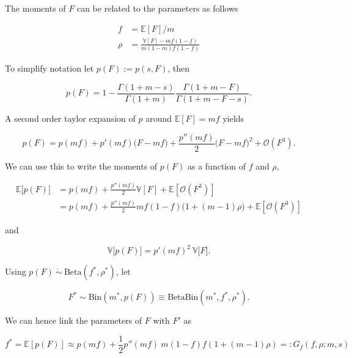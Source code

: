 \documentclass[american, abstract=on]{scrartcl}
\newcommand{\E}{\mathbb{E}}
\newcommand{\V}{\mathbb{V}}
\begin{document}
The moments of $F$ can be related to the parameters as follows

\begin{equation}
  \begin{split}
    f &= \E\left[F\right] / m \\
    \rho &= \frac{\V[F] - m f (1 - f)}{m (1 - m) f (1 - f)}
  \end{split}
\end{equation}

To simplify notation let $p(F) := p(s, F)$, then

\begin{equation}
  p(F) = 1 - \frac{\Gamma(1 + m - s)}{\Gamma(1 + m)}\frac{\Gamma(1 + m - F)}{\Gamma(1 + m - F - s)}.
\end{equation}

A second order taylor expansion of $p$ around $\E[F] = m f$ yields

\begin{equation}
  p(F) = p(m f) + p'(m f) \big(F - m f\big) + \frac{p''(m f)}{2} \big(F - m f\big)^2 + \mathcal{O}\left(F^3\right).
\end{equation}

We can use this to write the moments of $p(F)$ as a function of $f$ and $\rho$, 

\begin{equation}
  \begin{split}
    \E\big[p(F)\big]  &= p(m f) + \frac{p''(m f)}{2} \V[F] + \E\left[\mathcal{O}\left(F^3\right) \right] \\
    &= p(m f) + \frac{p''(m f)}{2} m f (1 - f) \big(1 + (m-1) \rho \big) +\E\left[\mathcal{O}\left(F^3\right) \right]
  \end{split}
\end{equation}

and

\begin{equation}
  \V\big[p(F)\big] = p'(m f)^2 \  \V\big[F\big].
\end{equation}

Using $p(F) \ \dot{\sim} \ \text{Beta}(f^*, \rho^*)$, let

\begin{equation}
  F^* \sim \text{Bin}(m^*, p(F)) \equiv \text{BetaBin}(m^*, f^*, \rho^*).
\end{equation}

We can hence link the parameters of $F$ with $F'$ as

\begin{equation}
  f^* = \E[p(F)] \approx p(m f) + \frac{1}{2} p''(m f) \ m (1 - f) f (1 + (m - 1) \rho) =: G_f(f, \rho; m, s)
\end{equation}
\end{document}
